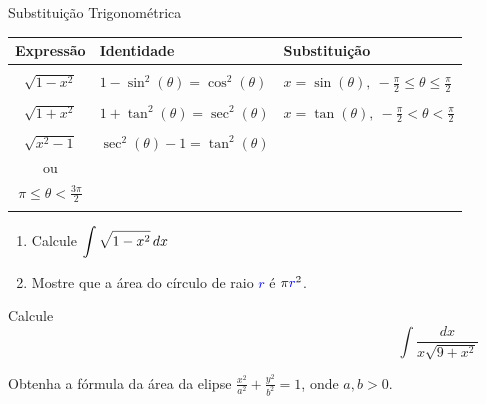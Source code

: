 \begin{frame}[label=int_trig]{Substituição Trigonométrica }

\begin{center}
\begin{tabular}{|c|l|l|}
\hline
 Expressão & Identidade & Substituição  \\ [1ex]
\hline 
& & \\
{\color{blue}$\sqrt{1-x^2}$} & {\color{blue}$1-\sin^2(\theta)=\cos^2(\theta)$}  & {\color{blue}$x=\sin(\theta),\ -\frac{\pi}{2}\leq \theta\leq \frac{\pi}{2}$}\\[1ex]
\hline
& & \\
{\color{red} $\sqrt{1+x^2}$} &  {\color{red} $1+\tan^2(\theta)=\sec^2(\theta)$}  & {\color{red}$x=\tan(\theta),\ -\frac{\pi}{2}< \theta< \frac{\pi}{2}$}  \\[1ex]
\hline
& & \\
{\color{red}$\sqrt{x^2-1}$} &   {\color{red} $\sec^2(\theta)-1=\tan^2(\theta)$}  & {\color{red}$x=\sec(\theta),$\ \makecell{$0\leq \theta< \frac{\pi}{2}$\\ ou \\ $\pi\leq \theta< \frac{3\pi}{2}$}}  \\
& & \\
\hline

\end{tabular}
\end{center}
\end{frame}

\begin{frame}[label=int_trig]

\begin{exe}
\begin{enumerate}
\item Calcule $\displaystyle\int\sqrt{1-x^2}\, dx$
\item Mostre que a área do círculo de raio \textcolor{blue}{$r$} é $\pi \textcolor{blue}{r}^2$.
\end{enumerate}
\end{exe}

\end{frame}

\begin{frame}
\begin{casa}
Calcule
\[ \int\frac{dx}{x\sqrt{9+x^2}}\]
\end{casa}

\begin{exer}
Obtenha a fórmula da área da elipse $\frac{x^2}{a^2}+\frac{y^2}{b^2}=1$, onde $a,b>0$.
\end{exer}
\end{frame}


